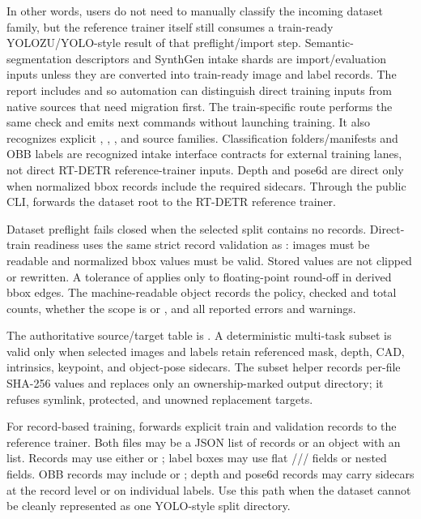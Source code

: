 In other words, users do not need to manually classify the incoming dataset family, but the reference trainer itself still consumes a train-ready YOLOZU/YOLO-style result of that preflight/import step. Semantic-segmentation descriptors and SynthGen intake shards are import/evaluation inputs unless they are converted into train-ready image and label records. The  report includes  and  so automation can distinguish direct training inputs from native sources that need migration first. The train-specific  route performs the same check and emits next commands without launching training. It also recognizes explicit , , , and  source families. Classification folders/manifests and OBB labels are recognized intake interface contracts for external training lanes, not direct RT-DETR reference-trainer inputs. Depth and pose6d are direct only when normalized bbox records include the required sidecars. Through the public CLI,  forwards the dataset root to the RT-DETR reference trainer.

Dataset preflight fails closed when the selected split contains no records. Direct-train readiness uses the same strict record validation as : images must be readable and normalized bbox values must be valid. Stored values are not clipped or rewritten. A tolerance of  applies only to floating-point round-off in derived bbox edges. The machine-readable  object records the policy, checked and total counts, whether the scope is  or , and all reported errors and warnings.

The authoritative source/target table is . A deterministic multi-task subset is valid only when selected images and labels retain referenced mask, depth, CAD, intrinsics, keypoint, and object-pose sidecars. The subset helper records per-file SHA-256 values and replaces only an ownership-marked output directory; it refuses symlink, protected, and unowned replacement targets.

For record-based training,  forwards explicit train and validation records to the reference trainer. Both files may be a JSON list of records or an object with an  list. Records may use either  or ; label boxes may use flat /// fields or nested  fields. OBB records may include  or ; depth and pose6d records may carry sidecars at the record level or on individual labels. Use this path when the dataset cannot be cleanly represented as one YOLO-style split directory.

